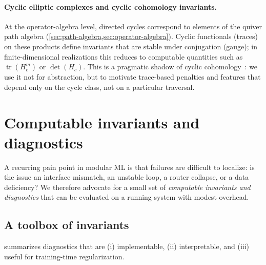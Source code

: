 \documentclass[11pt]{article}
\theoremstyle{definition}
\theoremstyle{plain}
\theoremstyle{remark}
\newcommand{\tr}{\operatorname{tr}}
\begin{document}
\paragraph{Cyclic elliptic complexes and cyclic cohomology invariants.}
At the operator-algebra level, directed cycles correspond to elements of the quiver path algebra (\cref{sec:path-algebra,sec:operator-algebra}).
Cyclic functionals (traces) on these products define invariants that are stable under conjugation (gauge); in finite-dimensional realizations this reduces to computable quantities such as $\tr(H_c^m)$ or $\det(H_c)$.
This is a pragmatic shadow of cyclic cohomology~\cite{ConnesNCG}: we use it not for abstraction, but to motivate trace-based penalties and features that depend only on the cycle class, not on a particular traversal.



\newpage

\section{Computable invariants and diagnostics}
\label{sec:invariants}

A recurring pain point in modular ML is that failures are difficult to localize: is the issue an interface mismatch, an unstable loop, a router collapse, or a data deficiency?
We therefore advocate for a small set of \emph{computable invariants and diagnostics} that can be evaluated on a running system with modest overhead.

\subsection{A toolbox of invariants}
 summarizes diagnostics that are (i) implementable, (ii) interpretable, and (iii) useful for training-time regularization.
\end{document}
